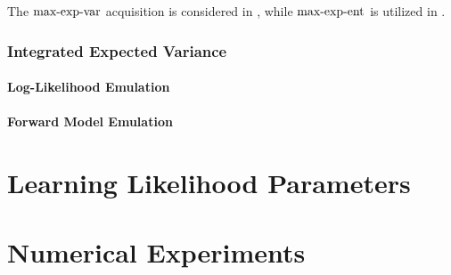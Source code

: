 \documentclass[12pt]{article}
\begin{document}
The $\textrm{max-exp-var}$ acquisition is considered in 
\cite{KandasamyActiveLearning2015, Kandasamy_2017}, 
while $\textrm{max-exp-ent}$ is utilized in \cite{wang2018adaptive, landslideCalibration}. 

\subsubsection{Integrated Expected Variance}

\paragraph{Log-Likelihood Emulation}

\paragraph{Forward Model Emulation}

\section{Learning Likelihood Parameters} \label{section_lik_par}

\section{Numerical Experiments}

\end{document}

